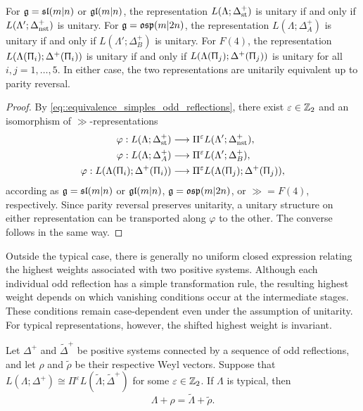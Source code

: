 \begin{proposition}\label{prop::transport_of_unitarity}
For $\gg=\sl(m\vert n)$ or $\gl(m\vert n)$, the representation $L(\Lambda;\Delta_{\st}^{+})$ is unitary if and only if $L(\Lambda';\Delta_{\nst}^{+})$ is unitary. For $\gg=\osp(m\vert2n)$, the representation $L(\Lambda;\Delta_{A}^{+})$ is unitary if and only if $L(\Lambda';\Delta_{B}^{+})$ is unitary. For $F(4)$, the representation $L(\Lambda(\Uppi_{i});\Delta^{+}(\Uppi_{i}))$ is unitary if and only if $L(\Lambda(\Uppi_{j});\Delta^{+}(\Uppi_{j}))$ is unitary for all $i,j=1,\ldots, 5.$ In either case, the two representations are unitarily equivalent up to parity reversal.
\end{proposition}

\begin{proof}
By \eqref{eq::equivalence_simples_odd_reflections}, there exist
$\varepsilon\in\ZZ_2$ and an isomorphism of $\gg$-representations
\begin{equation*}
\begin{aligned}
\varphi:
L(\Lambda;\Delta_{\st}^{+})
&\longrightarrow
\Pi^\varepsilon L(\Lambda';\Delta_{\nst}^{+}),
\\
\varphi:
L(\Lambda;\Delta_{A}^{+})
&\longrightarrow
\Pi^\varepsilon L(\Lambda';\Delta_{B}^{+}),
\\
\varphi:
L(\Lambda(\Uppi_{i});\Delta^{+}(\Uppi_i))
&\longrightarrow
\Pi^\varepsilon L(\Lambda(\Uppi_{j});\Delta^{+}(\Uppi_j)),
\end{aligned}
\end{equation*}
according as $\gg=\sl(m\vert n)$ or $\gl(m\vert n)$,
$\gg=\osp(m\vert2n)$, or $\gg=F(4)$, respectively. Since parity reversal preserves unitarity, a unitary structure on either representation can be transported along $\varphi$ to the other. The converse follows in the same way.
\end{proof}

Outside the typical case, there is generally no uniform closed
expression relating the highest weights associated with two positive
systems. Although each individual odd reflection has a simple
transformation rule, the resulting highest weight depends on which
vanishing conditions occur at the intermediate stages. These
conditions remain case-dependent even under the assumption of
unitarity. For typical representations, however, the shifted highest
weight is invariant.

\begin{lemma}\label{lemm::typical_shifted_highest_weight}
Let $\Delta^{+}$ and $\widetilde{\Delta}^{+}$ be positive systems
connected by a sequence of odd reflections, and let $\rho$ and
$\widetilde{\rho}$ be their respective Weyl vectors. Suppose that
$
L(\Lambda;\Delta^{+})
\cong
\Pi^\varepsilon
L(\widetilde{\Lambda};\widetilde{\Delta}^{+})
$
for some $\varepsilon\in\ZZ_2$. If $\Lambda$ is typical, then
\[
\Lambda+\rho
=
\widetilde{\Lambda}+\widetilde{\rho}.
\]
\end{lemma}

